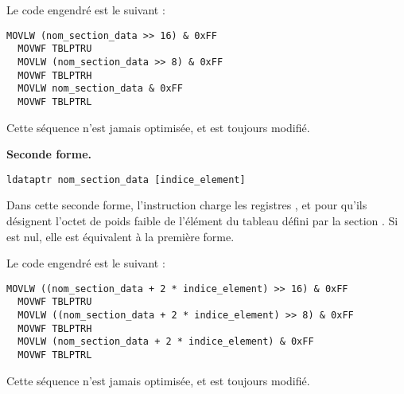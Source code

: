 Le code engendré est le suivant :
\begin{lstlisting}[language=assembleur]
  MOVLW (nom_section_data >> 16) & 0xFF
  MOVWF TBLPTRU
  MOVLW (nom_section_data >> 8) & 0xFF
  MOVWF TBLPTRH
  MOVLW nom_section_data & 0xFF
  MOVWF TBLPTRL
\end{lstlisting}

Cette séquence n'est jamais optimisée, et  est toujours modifié.

\textbf{Seconde forme.}

\begin{lstlisting}[language=piccolo]
  ldataptr nom_section_data [indice_element]
\end{lstlisting}

Dans cette seconde forme, l'instruction charge les registres ,  et  pour qu'ils désignent l'octet de poids faible de l'élément  du tableau défini par la section . Si  est nul, elle est équivalent à la première forme.

Le code engendré est le suivant :
\begin{lstlisting}[language=assembleur]
  MOVLW ((nom_section_data + 2 * indice_element) >> 16) & 0xFF
  MOVWF TBLPTRU
  MOVLW ((nom_section_data + 2 * indice_element) >> 8) & 0xFF
  MOVWF TBLPTRH
  MOVLW (nom_section_data + 2 * indice_element) & 0xFF
  MOVWF TBLPTRL
\end{lstlisting}

Cette séquence n'est jamais optimisée, et  est toujours modifié.





